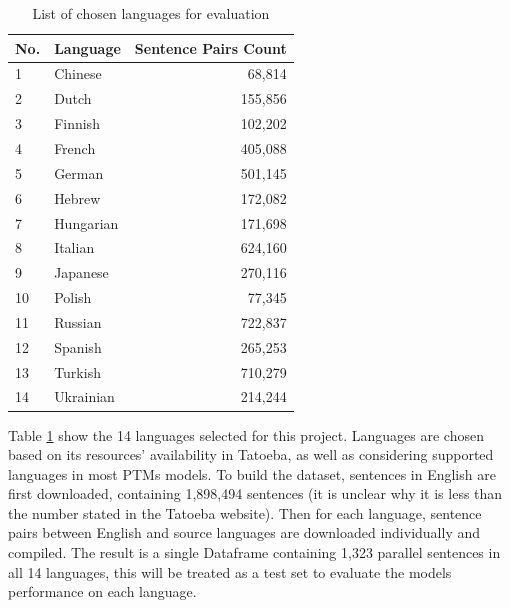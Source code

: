 \documentclass[a4paper]{article}
\begin{document}
\begin{table}[htbp]
    \centering
    \begin{tabular}{|l|l|r|}
        \hline
        \textbf{No.} & \textbf{Language} & \textbf{Sentence Pairs Count} \\
        \hline
        1            & Chinese           & 68,814                        \\
        2            & Dutch             & 155,856                       \\
        3            & Finnish           & 102,202                       \\
        4            & French            & 405,088                       \\
        5            & German            & 501,145                       \\
        6            & Hebrew            & 172,082                       \\
        7            & Hungarian         & 171,698                       \\
        8            & Italian           & 624,160                       \\
        9            & Japanese          & 270,116                       \\
        10           & Polish            & 77,345                        \\
        11           & Russian           & 722,837                       \\
        12           & Spanish           & 265,253                       \\
        13           & Turkish           & 710,279                       \\
        14           & Ukrainian         & 214,244                       \\
        \hline
    \end{tabular}
    \caption{List of chosen languages for evaluation}
    \label{table:eval_languages}
\end{table}

Table \ref{table:eval_languages} show the 14 languages selected for this project. Languages are chosen based on its resources' availability in Tatoeba, as well as considering supported languages in most PTMs models. To build the dataset, sentences in English are first downloaded, containing 1,898,494 sentences (it is unclear why it is less than the number stated in the Tatoeba website). Then for each language, sentence pairs between English and source languages are downloaded individually and compiled. The result is a single Dataframe containing 1,323 parallel sentences in all 14 languages, this will be treated as a test set to evaluate the models performance on each language.
\end{document}
